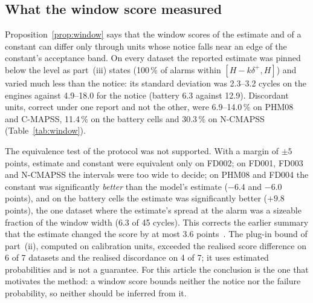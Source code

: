 \subsection{What the window score measured}\label{sec:res-window}

Proposition~\ref{prop:window} says that the window scores of the estimate and of a constant can differ only through units whose notice falls near an edge of the constant's acceptance band. On every dataset the reported estimate was pinned below the level as part~(iii) states (100\,\% of alarms within $[H-k\delta^+,H]$) and varied much less than the notice: its standard deviation was 2.3--3.2 cycles on the engines against 4.9--18.0 for the notice (battery 6.3 against 12.9). Discordant units, correct under one report and not the other, were 6.9--14.0\,\% on PHM08 and C-MAPSS, 11.4\,\% on the battery cells and 30.3\,\% on N-CMAPSS (Table~\ref{tab:window}).

The equivalence test of the protocol was not supported. With a margin of $\pm5$ points, estimate and constant were equivalent only on FD002; on FD001, FD003 and N-CMAPSS the intervals were too wide to decide; on PHM08 and FD004 the constant was significantly \emph{better} than the model's estimate ($-6.4$ and $-6.0$ points), and on the battery cells the estimate was significantly better ($+9.8$ points), the one dataset where the estimate's spread at the alarm was a sizeable fraction of the window width (6.3 of 45 cycles). This corrects the earlier summary that the estimate changed the score by at most 3.6 points~\cite{prior}. The plug-in bound of part~(ii), computed on calibration units, exceeded the realised score difference on 6 of 7 datasets and the realised discordance on 4 of 7; it uses estimated probabilities and is not a guarantee. For this article the conclusion is the one that motivates the method: a window score bounds neither the notice nor the failure probability, so neither should be inferred from it.

